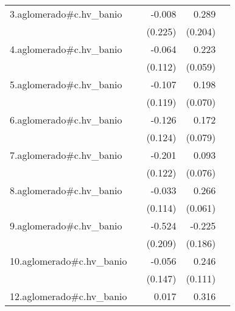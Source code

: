 {\begin{longtable}{l*{4}{D{.}{.}{-1}}}
\addlinespace
3.aglomerado#c.hv\_banio&                     &      -0.008         &       0.289         &                     \\
            &                     &     (0.225)         &     (0.204)         &                     \\
\addlinespace
4.aglomerado#c.hv\_banio&                     &      -0.064         &       0.223\sym{***}&                     \\
            &                     &     (0.112)         &     (0.059)         &                     \\
\addlinespace
5.aglomerado#c.hv\_banio&                     &      -0.107         &       0.198\sym{**} &                     \\
            &                     &     (0.119)         &     (0.070)         &                     \\
\addlinespace
6.aglomerado#c.hv\_banio&                     &      -0.126         &       0.172\sym{*}  &                     \\
            &                     &     (0.124)         &     (0.079)         &                     \\
\addlinespace
7.aglomerado#c.hv\_banio&                     &      -0.201         &       0.093         &                     \\
            &                     &     (0.122)         &     (0.076)         &                     \\
\addlinespace
8.aglomerado#c.hv\_banio&                     &      -0.033         &       0.266\sym{***}&                     \\
            &                     &     (0.114)         &     (0.061)         &                     \\
\addlinespace
9.aglomerado#c.hv\_banio&                     &      -0.524\sym{*}  &      -0.225         &                     \\
            &                     &     (0.209)         &     (0.186)         &                     \\
\addlinespace
10.aglomerado#c.hv\_banio&                     &      -0.056         &       0.246\sym{*}  &                     \\
            &                     &     (0.147)         &     (0.111)         &                     \\
\addlinespace
12.aglomerado#c.hv\_banio&                     &       0.017         &       0.316\sym{**} &                     \\

\end{longtable}}
